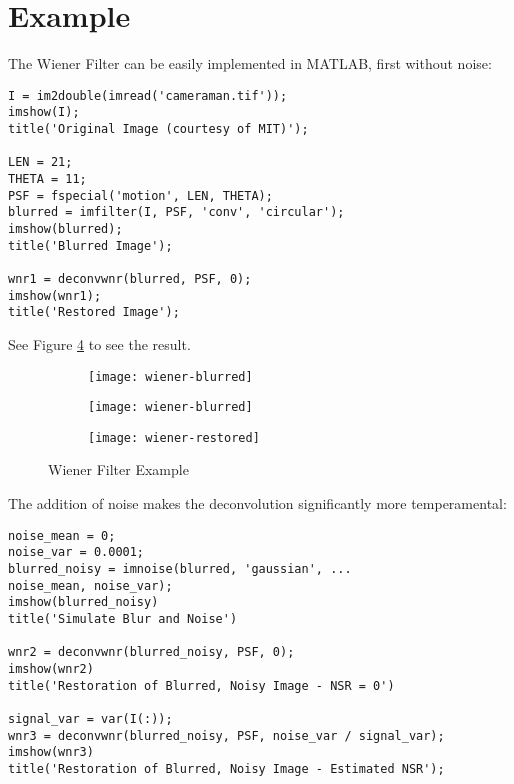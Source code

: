 \section{Example}
The Wiener Filter can be easily implemented in MATLAB, first without noise:
\begin{lstlisting}
I = im2double(imread('cameraman.tif'));
imshow(I);
title('Original Image (courtesy of MIT)');

LEN = 21;
THETA = 11;
PSF = fspecial('motion', LEN, THETA);
blurred = imfilter(I, PSF, 'conv', 'circular');
imshow(blurred);
title('Blurred Image');

wnr1 = deconvwnr(blurred, PSF, 0);
imshow(wnr1);
title('Restored Image');
\end{lstlisting}
See Figure \ref{fig:wiener} to see the result.

\begin{figure}[ht]
	\centering
	\begin{subfigure}[b]{0.3\textwidth}
		\centering
		\texttt{[image: wiener-blurred]}
		\caption{}
		\label{fig:wiener-original}
	\end{subfigure}\hfill
	\begin{subfigure}[b]{0.3\textwidth}
		\centering
		\texttt{[image: wiener-blurred]}
		\caption{}
		\label{fig:wiener-blurred}
	\end{subfigure}\hfill
	\begin{subfigure}[b]{0.3\textwidth}
		\centering
		\texttt{[image: wiener-restored]}
		\caption{}
		\label{fig:wiener-restored}
	\end{subfigure}
	\caption{Wiener Filter Example}\label{fig:wiener}
\end{figure}


The addition of noise makes the deconvolution significantly more temperamental:
\begin{lstlisting}
noise_mean = 0;
noise_var = 0.0001;
blurred_noisy = imnoise(blurred, 'gaussian', ...
noise_mean, noise_var);
imshow(blurred_noisy)
title('Simulate Blur and Noise')

wnr2 = deconvwnr(blurred_noisy, PSF, 0);
imshow(wnr2)
title('Restoration of Blurred, Noisy Image - NSR = 0')

signal_var = var(I(:));
wnr3 = deconvwnr(blurred_noisy, PSF, noise_var / signal_var);
imshow(wnr3)
title('Restoration of Blurred, Noisy Image - Estimated NSR');
\end{lstlisting}

